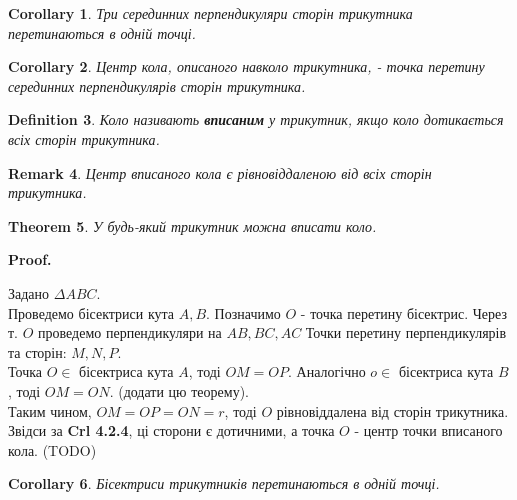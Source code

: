 \documentclass[a4paper, 10pt]{article}
\makeatletter
\def\qed{$\blacksquare$}
\theoremstyle{theoremdd}
\newtheorem{theorem}{Theorem}[subsection]
\theoremstyle{theoremdd}
\theoremstyle{theoremdd}
\newtheorem{definition}[theorem]{Definition}
\theoremstyle{theoremdd}
\theoremstyle{theoremdd}
\theoremstyle{theoremdd}
\theoremstyle{theoremdd}
\newtheorem{remark}[theorem]{Remark}
\theoremstyle{theoremdd}
\theoremstyle{theoremdd}
\newtheorem{corollary}[theorem]{Corollary}
\renewenvironment{proof}[1][Proof.\\]{\par
\pushQED{\hfill \qed}%
\normalfont \topsep6\p@\@plus6\p@\relax
\trivlist
\item\relax
{\bfseries
#1\@addpunct{.}}\hspace\labelsep\ignorespaces
}{%
\popQED\endtrivlist\@endpefalse
}
\makeatother
\begin{document}
\begin{corollary}
Три серединних перпендикуляри сторін трикутника перетинаються в одній точці.
\end{corollary}

\begin{corollary}
Центр кола, описаного навколо трикутника, - точка перетину серединних перпендикулярів сторін трикутника.
\end{corollary}

\begin{definition}
Коло називають \textbf{вписаним} у трикутник, якщо коло дотикається всіх сторін трикутника.
\begin{figure}[H]
\centering
{}
\end{figure}
\end{definition}

\begin{remark}
Центр вписаного кола є рівновіддаленою від всіх сторін трикутника.
\end{remark}

\begin{theorem}
У будь-який трикутник можна вписати коло.
\end{theorem}

\begin{proof}
Задано $\Delta ABC$.\\
Проведемо бісектриси кута $A,B$. Позначимо $O$ - точка перетину бісектрис. Через т. $O$ проведемо перпендикуляри на $AB,BC,AC$ Точки перетину перпендикулярів та сторін: $M,N,P$.\\
Точка $O \in$ бісектриса кута $A$, тоді $OM = OP$. Аналогічно $o \in$ бісектриса кута $B$, тоді $OM = ON$. (додати цю теорему).\\
Таким чином, $OM = OP = ON = r$, тоді $O$ рівновіддалена від сторін трикутника. Звідси за \textbf{Crl 4.2.4}, ці сторони є дотичними, а точка $O$ - центр точки вписаного кола.
(TODO)
\end{proof}

\begin{corollary}
Бісектриси трикутників перетинаються в одній точці.
\end{corollary}
\end{document}
